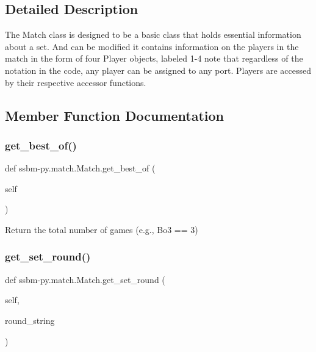 \subsection{Detailed Description}
\begin{DoxyVerb}The Match class is designed to be a basic class that
holds essential information about a set. And can be modified
it contains information on the players in the match
in the form of four Player objects, labeled 1-4
note that regardless of the notation in the code,
any player can be assigned to any port. Players are accessed
by their respective accessor functions.
\end{DoxyVerb}
 

\subsection{Member Function Documentation}
\mbox{\label{classssbm-py_1_1match_1_1_match_abc1ed5b3ce5ad859ce6f0efe4c53b0c4}} 
\subsubsection{\texorpdfstring{get\+\_\+best\+\_\+of()}{get\_best\_of()}}
{\footnotesize\ttfamily def ssbm-\/py.\+match.\+Match.\+get\+\_\+best\+\_\+of (\begin{DoxyParamCaption}\item[{}]{self }\end{DoxyParamCaption})}

\begin{DoxyVerb}Return the total number of games (e.g., Bo3 == 3)\end{DoxyVerb}
 \mbox{\label{classssbm-py_1_1match_1_1_match_acfdd80d2f04e2d98050447d905ab368d}} 
\subsubsection{\texorpdfstring{get\+\_\+set\+\_\+round()}{get\_set\_round()}}
{\footnotesize\ttfamily def ssbm-\/py.\+match.\+Match.\+get\+\_\+set\+\_\+round (\begin{DoxyParamCaption}\item[{}]{self,  }\item[{}]{round\+\_\+string }\end{DoxyParamCaption})}

